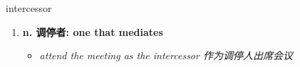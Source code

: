 
\begin{frame}
{\huge intercessor}
\begin{center}
\begin{enumerate}\Large
  \item \textbf{n. 调停者: one that mediates}
  \begin{itemize}
    \item \em{\Large{attend the meeting as the intercessor 作为调停人出席会议}}
  \end{itemize}
\end{enumerate}
\end{center}
\end{frame}
